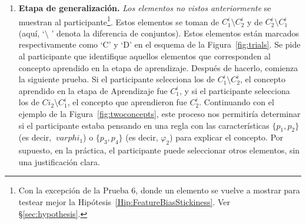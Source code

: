 \begin{enumerate}
	\item {\bf Etapa de generalización.} {\em Los elementos no vistos anteriormente} se muestran al participante\footnote{Con la excepción de la Prueba 6, donde un elemento se vuelve a mostrar para testear mejor la Hipótesis~\ref{Hip:FeatureBiasStickiness}. Ver \S\ref{sec:hypothesis}.}. Estos elementos se toman de $C^i_1 \setminus C^i_2$ y de $C^i_2 \setminus C^i_1$ (aquí, `$\setminus$ ' denota la diferencia de conjuntos). Estos elementos están marcados respectivamente como `{\sf C}' y `{\sf D}' en el esquema de la Figura~\ref{fig:trials}. Se pide al participante que identifique aquellos elementos que corresponden al concepto aprendido en la etapa de aprendizaje. Después de hacerlo, comienza la siguiente prueba. Si el participante selecciona los de $C^i_1 \setminus C^i_2$, el concepto aprendido en la etapa de Aprendizaje fue $C^i_1$, y si el participante selecciona los de $C i_2 \setminus C^i_1$, el concepto que aprendieron fue $C^i_2$.
    Continuando con el ejemplo de la Figura~\ref{fig:twoconcepts}, este proceso nos permitiría determinar si el participante estaba pensando en una regla con las características $\{p_1, p_2 \}$ (es decir, $\ varphi_1$) o $\{p_3, p_4 \}$ (es decir, $\varphi_2$) para explicar el concepto. Por supuesto, en la práctica, el participante puede seleccionar otros elementos, sin una justificación clara.


\end{enumerate}
